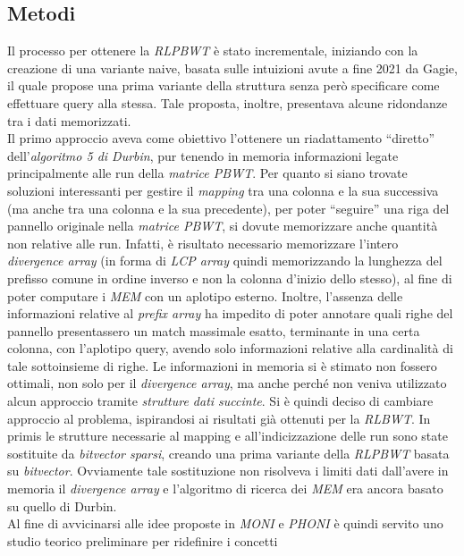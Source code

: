 \documentclass[a4paper,11pt, oneside]{article}
\begin{document}
\subsection*{Metodi}
Il processo per ottenere la \textit{RLPBWT} è stato incrementale,
iniziando con la creazione di una variante naive, basata sulle intuizioni avute
a fine 2021 da Gagie, il quale propose una prima variante della struttura senza
però specificare come effettuare query alla stessa. Tale proposta, inoltre,
presentava alcune ridondanze tra i dati memorizzati.\\
Il primo approccio aveva come obiettivo l'ottenere un riadattamento ``diretto''
dell'\textit{algoritmo 5 di Durbin}, pur tenendo in memoria informazioni legate
principalmente alle run della \textit{matrice PBWT}. Per quanto si siano trovate
soluzioni interessanti per gestire il \textit{mapping} tra una colonna e la sua
successiva (ma anche tra una colonna e la sua precedente), per poter
``seguire'' una riga del pannello originale nella 
\textit{matrice PBWT}, si dovute memorizzare anche quantità non relative alle
run.  Infatti, è risultato necessario memorizzare l'intero
\textit{divergence array} (in forma di \textit{LCP array} quindi
memorizzando la lunghezza del prefisso comune in ordine inverso e non la colonna
d'inizio dello stesso), al fine di poter computare i \textit{MEM} con
un aplotipo esterno. Inoltre, l'assenza delle informazioni relative al
\textit{prefix array} ha impedito di poter annotare quali righe del pannello
presentassero un match massimale esatto, terminante in una certa colonna, con
l'aplotipo query, avendo solo 
informazioni relative alla cardinalità di tale sottoinsieme di righe. Le
informazioni in memoria si è 
stimato non fossero ottimali, non solo per il \textit{divergence array}, ma anche
perché non veniva utilizzato alcun approccio tramite \textit{strutture dati
  succinte}. Si è quindi deciso di
cambiare approccio al problema, ispirandosi ai risultati già ottenuti per la
\textit{RLBWT}. In primis le strutture necessarie al mapping e
all'indicizzazione delle run sono state sostituite da \textit{bitvector
  sparsi}, creando una prima variante della \textit{RLPBWT} basata su
\textit{bitvector}. Ovviamente tale sostituzione non risolveva i limiti dati
dall'avere in memoria il \textit{divergence array} e l'algoritmo di ricerca dei
\textit{MEM} era ancora basato su quello di Durbin. \\
Al fine di avvicinarsi alle idee proposte in \textit{MONI} e \textit{PHONI} è
quindi servito uno studio teorico preliminare per ridefinire i concetti
\end{document}
